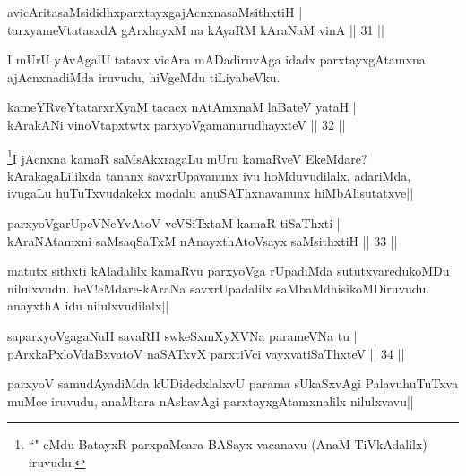 \begin{shl}
avicAritasaMsididhxparxtayxgajAcnxnasaMsithxtiH |\\
tarxyameVtatasxdA gArxhayxM na kAyaRM kAraNaM vinA \hfill || 31 ||
\end{shl}

\begin{artha}
I mUrU yAvAgalU tatavx vicAra mADadiruvAga idadx parxtayxgAtamxna ajAcnxnadiMda iruvudu, hiVgeMdu tiLiyabeVku. 
\end{artha}


\begin{shl}
kameYRveYtatarxrXyaM tacacx nA\s \s tAmxnaM laBateV yataH |\\
kArakANi vinoVtapxtwtx parxyoVgamanurudhayxteV \hfill || 32 ||
\end{shl}

\begin{artha}
\footnote[1]{``\stext " eMdu BatayxR parxpaMcara BASayx vacanavu (AnaM-TiVkAdalilx) iruvudu.}I jAcnxna kamaR saMsAkxragaLu mUru kamaRveV EkeMdare? kArakagaLililxda tananx savxrUpavanunx ivu hoMduvudilalx. adariMda, ivugaLu huTuTxvudakekx modalu anuSAThxnavanunx hiMbAlisutatxve||
\end{artha}

\begin{shl}
parxyoVgarUpeVNeYvAtoV veVSiTxtaM kamaR tiSaThxti |\\
kAraNAtamxni saMsaqSaTxM nAnayxthA\s toV\s sayx saMsithxtiH \hfill || 33 ||
\end{shl}

\begin{artha}%
matutx sithxti kAladalilx kamaRvu parxyoVga rUpadiMda sututxvaredukoMDu nilulxvudu. heV!eMdare-kAraNa savxrUpadalilx saMbaMdhisikoMDiruvudu. anayxthA idu nilulxvudilalx||
\end{artha}

\begin{shl}
saparxyoVgagaNaH savaRH swkeSxmXyXVNa parameVNa tu |\\
pArxkaPxloVdaBxvatoV naSATxvX parxtiVci vayxvatiSaThxteV \hfill || 34 ||
\end{shl}

\begin{artha}
parxyoV samudAyadiMda kUDidedxlalxvU parama sUkaSxvAgi PalavuhuTuTxva muMce iruvudu, anaMtara nAshavAgi parxtayxgAtamxnalilx nilulxvavu||
\end{artha}

